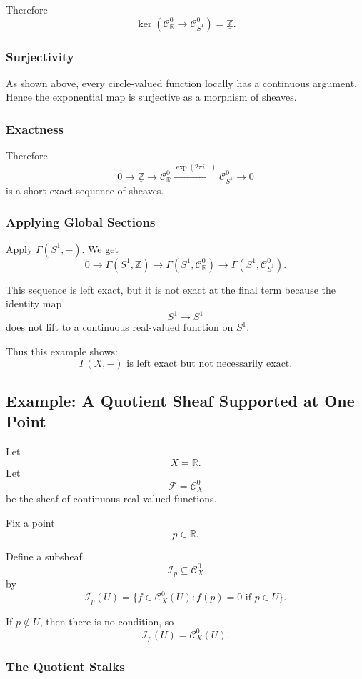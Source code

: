 \documentclass[12pt,a4paper]{article}
\newcommand{\F}{\mathcal F}
\newcommand{\RR}{\mathbb{R}}
\newcommand{\ZZ}{\mathbb{Z}}
\newcommand{\Czero}{\mathcal C^0}        %
\theoremstyle{notespace}
\newcommand{\SSone}{S^1}
\begin{document}
Therefore
\[
\ker\left(\Czero_{\RR}\to \Czero_{\SSone}\right)
=
\underline{\ZZ}.
\]

\subsubsection*{Surjectivity}

As shown above, every circle-valued function locally has a continuous argument. Hence the exponential map is surjective as a morphism of sheaves.

\subsubsection*{Exactness}

Therefore
\[
0\to \underline{\ZZ}
\to \Czero_{\RR}
\xrightarrow{\exp(2\pi i\,\cdot)}
\Czero_{\SSone}
\to 0
\]
is a short exact sequence of sheaves.

\subsubsection*{Applying Global Sections}

Apply \(\Gamma(\SSone,-)\). We get
\[
0\to \Gamma(\SSone,\underline{\ZZ})
\to \Gamma(\SSone,\Czero_{\RR})
\to \Gamma(\SSone,\Czero_{\SSone}).
\]

This sequence is left exact, but it is not exact at the final term because the identity map
\[
\SSone\to \SSone
\]
does not lift to a continuous real-valued function on \(\SSone\).

Thus this example shows:
\[
\boxed{
	\Gamma(X,-)\text{ is left exact but not necessarily exact.}
}
\]

\subsection{Example: A Quotient Sheaf Supported at One Point}

Let
\[
X=\RR.
\]
Let
\[
\F=\Czero_X
\]
be the sheaf of continuous real-valued functions.

Fix a point
\[
p\in \RR.
\]

Define a subsheaf
\[
\mathcal I_p\subseteq \Czero_X
\]
by
\[
\mathcal I_p(U)
=
\{f\in \Czero_X(U): f(p)=0 \text{ if } p\in U\}.
\]

If \(p\notin U\), then there is no condition, so
\[
\mathcal I_p(U)=\Czero_X(U).
\]

\subsubsection*{The Quotient Stalks}
\end{document}
